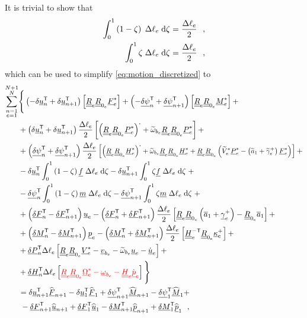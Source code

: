 \documentclass[12pt,a4paper,oneside,english]{abntex2} %
\newcommand{\fix}[1]{{\color{red}#1}}
\newcommand{\vect}[1]{\underline{#1}}
\newcommand{\uvec}[1]{\overline{#1}}
\def\tens#1{\underline{\underline{#1}}}
\def\til#1{\widetilde{#1}}
\def\lb{\left[}
\def\rb{\right]}
\def\lp{\left(}
\def\rp{\right)}
\def\T{\mathsf{T}}
\def\aone{\uvec{a}_1}
\def\aonetil{\til{a}_1}
\def\dotout{^{\boldsymbol{\cdot}}}
\def\R{\tens{R}}
\def\u{\vect{u}}
\def\udot{\dot{\u}}
\def\uhat{\widehat{\u}}
\def\gam{\vect{\gamma}}
\def\gamp{\gam^{+}}
\def\kap{\vect{\kappa}}
\def\kapp{\kap^{+}}
\def\V{\vect{V}}
\def\Vs{\V^{*}}
\def\Om{\vect{\Omega}}
\def\Oms{\Om^{*}}
\def\P{\vect{P}}
\def\Ps{\P^*}
\def\Hv{\vect{H}}
\def\Hvs{\Hv^*}
\def\H{\tens{H}}
\def\p{\vect{p}}
\def\pdot{\dot{\p}}
\def\phat{\widehat{\p}}
\def\F{\vect{F}}
\def\Fhat{\widehat{\F}}
\def\Fs{\F^*}
\def\M{\vect{M}}
\def\Mhat{\widehat{\M}}
\def\Ms{\M^*}
\def\f{\vect{f}}
\def\m{\vect{m}}
\def\delF{\vect{\delta F}}
\def\delM{\vect{\delta M}}
\def\delP{\vect{\delta P}}
\def\delH{\vect{\delta H}}
\def\delpsi{\vect{\delta\psi}}
\def\Deltal{\Delta \ell_e}
\def\dlotwo{\frac{\Deltal}{2}}
\def\d{\textnormal{d}}
\def\vbe{\vect{v}_{b_e}}
\def\ombe{\vect{\omega}_{b_e}}
\def\omtilbe{\til{\omega}_{b_e}}
\def\ue{\u_e}
\def\udote{\udot_e}
\def\pe{\p_e}
\def\pdote{\pdot_e}
\def\Vse{\Vs_e}
\def\Vtilse{\til{V}^*_{e}}
\def\Omse{\Oms_e}
\def\gampe{\gamp_e}
\def\kappe{\kapp_e}
\def\gamptile{\til{\gamma}^{+}_e}
\def\Fse{\Fs_e}
\def\Mse{\Ms_e}
\def\Pse{\Ps_e}
\def\Hse{\Hvs_e}
\def\He{\H_e}
\def\HinvTe{\H^{-\T}_e}
\def\Re{\R_{e}}
\def\Rze{\R_{0_e}}
\begin{document}
It is trivial to show that
\begin{equation}
    \begin{aligned}
        \int_0^1 \lp1-\zeta\rp  \;\Deltal\;\d\zeta &= \dlotwo \ \ ,
        \\
        \int_0^1 \zeta \;\Deltal\;\d\zeta &= \dlotwo \ \ ,
        \label{eq:integrals_zeta}
    \end{aligned}
\end{equation}
which can be used to simplify \cref{eq:motion_discretized} to
\begin{align}	  \sum_{\substack{n=1\\e=1}}^{\substack{N+1\\N}}&\Biggl\{\Biggr.
    \lp-\delta\u_n^\T+\delta\u_{n+1}^\T\rp\lb\Re\Rze\Fse\rb + \lp-\delpsi_n^\T+\delpsi_{n+1}^\T\rp\lb\Re\Rze\Mse\rb +  
    \nonumber \\ 
    &+\lp\delta\u_{n}^\T+ \delta\u_{n+1}^\T\rp\dlotwo\lb\lp\Re\Rze\Pse\rp\dotout+\omtilbe\Re\Rze\Pse\rb +
    \nonumber \\
	&+\lp\delpsi_{n}^\T+\delpsi_{n+1}^\T\rp\dlotwo\lb\scalebox{0.9}{$\displaystyle \lp\Re\Rze\Hse\rp\dotout+\omtilbe\Re\Rze\Hse + \Re\Rze\lp\Vtilse\Pse-\lp\aonetil+\gamptile\rp\Fse\rp$}\rb + 
	\nonumber \\
	&-\delta\u_{n}^\T\int_0^1\lp1-\zeta\rp\f \;\Deltal\;\d\zeta - \delta\u_{n+1}^\T\int_0^1\zeta\f \;\Deltal\;\d\zeta \;+
    \nonumber \\
	&-\delpsi_{n}^\T\int_0^1\lp1-\zeta\rp\m \;\Deltal\;\d\zeta - \delpsi_{n+1}^\T\int_0^1\zeta\m \;\Deltal\;\d\zeta \;+
    \nonumber \\
	&+\lp\delF_n^\T-\delF_{n+1}^\T\rp\ue  -\lp\delF_{n}^\T+\delF_{n+1}^\T\rp\dlotwo\lb\Re\Rze\lp\aone+\gampe\rp-\Rze\aone\rb +
	\nonumber \\
	&+\lp\delM_n^\T-\delM_{n+1}^\T\rp\pe - \lp\delM_{n}^\T+\delM_{n+1}^\T\rp         \dlotwo\lb\HinvTe\Rze\kappe\rb +
	\nonumber \\
	&+\delP_{n}^\T\Deltal \lb\Re\Rze\Vse-\vbe-\omtilbe\ue-\udote\rb + 
    \nonumber \\
    &+\delH_{n}^\T\Deltal\lb\fix{\Re\Rze\Omse-\ombe-\He\pdote}\rb
	\Biggl.\Biggr\}
	\nonumber \\
	&=\delta\u_{n+1}^\T\Fhat_{n+1} - \delta\u_{1}^\T\Fhat_{1} + \delpsi_{n+1}^\T\Mhat_{n+1} - \delpsi_{1}^\T\Mhat_{1} +
	\nonumber \\
	&\;-\delF_{n+1}^\T\uhat_{n+1} + 
	\delF_{1}^\T\uhat_{1} -
	\delM_{n+1}^\T\phat_{n+1} +
	\delM_{1}^\T\phat_{1} \ \ ,
    \label{eq:motion_discretized2}
\end{align}
\end{document}
